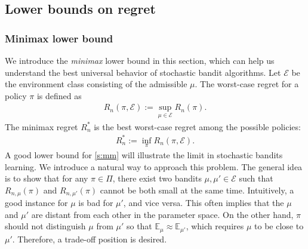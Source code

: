 \documentclass[10pt,a4article]{article}
\numberwithin{equation}{section}
\theoremstyle{plain}
\theoremstyle{definition}
\def\E{{\mathbb E}}
\def\V{{\mathcal E}}
\def\e{{\varepsilon}}
\begin{document}



\subsection{Lower bounds on regret}

\subsubsection{Minimax lower bound}

We introduce the \emph{minimax} lower bound in this section, which can help us understand the best universal behavior of stochastic bandit algorithms. Let $\V$ be the environment class consisting of the admissible $\mu$. The worst-case regret for a policy $\pi$ is defined as 
\begin{align*}
R_n(\pi, \V):=\sup_{\mu\in\V}R_n(\pi).
\end{align*}
The minimax regret $R_n^*$ is the best worst-case regret among the possible policies: 
\begin{align}
R_n^*:=\inf_{\pi}R_n(\pi, \V).\label{s:mm}
\end{align}
A good lower bound for \eqref{s:mm} will illustrate the limit in stochastic bandits learning. We introduce a natural way to approach this problem.  The general idea is to show that for any $\pi\in\Pi$, there exist two bandits $\mu, \mu'\in\V$ such that $R_{n,\mu}(\pi)$ and $R_{n,\mu'}(\pi)$ cannot be both small at the same time. Intuitively, a good instance for $\mu$ is bad for $\mu'$, and vice versa. This often implies that the $\mu$ and $\mu'$ are distant from each other in the parameter space. On the other hand, $\pi$ should not distinguish $\mu$ from $\mu'$ so that $\E_\mu\approx\E_{\mu'}$, which requires $\mu$ to be close to $\mu'$. Therefore, a trade-off position is desired.  
\end{document}
